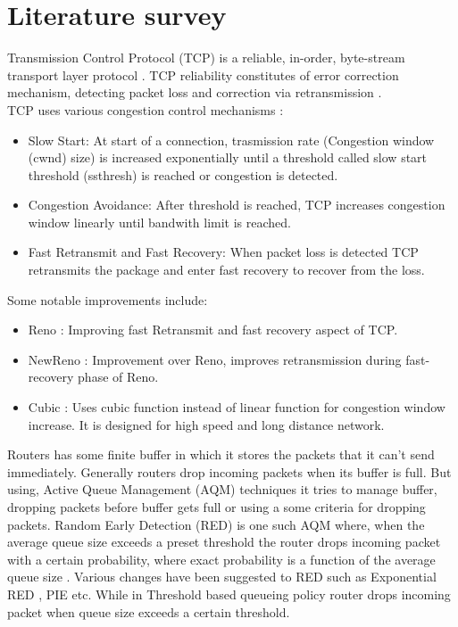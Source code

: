 \section{Literature survey}
Transmission Control Protocol (TCP) is a reliable, in-order, byte-stream transport layer protocol \cite{rfc9293}. TCP reliability constitutes of error correction mechanism, detecting packet loss and correction via retransmission \cite{rfc9293}. \\
TCP uses various congestion control mechanisms \cite{rfc5681} :
\begin{itemize}
    \item Slow Start: At start of a connection, trasmission rate (Congestion window (cwnd) size) is increased exponentially until a threshold called slow start threshold (ssthresh) is reached or congestion is detected.
    \item Congestion Avoidance: After threshold is reached, TCP increases congestion window linearly
until bandwith limit is reached.
    \item Fast Retransmit and Fast Recovery: When packet loss is detected TCP retransmits the package
and enter fast recovery to recover from the loss.
\end{itemize}
Some notable improvements include:
\begin{itemize}
    \item Reno \cite{rfc5681}: Improving fast Retransmit and fast recovery aspect of TCP.
    \item NewReno \cite{rfc6582}: Improvement over Reno, improves retransmission during fast-recovery phase of Reno. \
    \item Cubic \cite{rfc9438}: Uses cubic function instead of linear function for congestion window increase. It is designed for high speed and long distance network.
\end{itemize}
Routers has some finite buffer in which it stores the packets that it can't send immediately. Generally routers drop incoming packets when its buffer is full. But using, Active Queue Management (AQM) techniques it tries to manage buffer, dropping packets before buffer gets full or using a some criteria for dropping packets\cite{bachl22}. Random Early Detection (RED) is one such AQM where, when the average queue size exceeds a preset threshold the router drops incoming packet with a certain probability, where exact probability is a function of the average queue size \cite{floyd93}. Various changes have been suggested to RED such as Exponential RED \cite{shao05}, PIE \cite{pan13} etc. While in Threshold based queueing policy router drops incoming packet when queue size exceeds a certain threshold.

